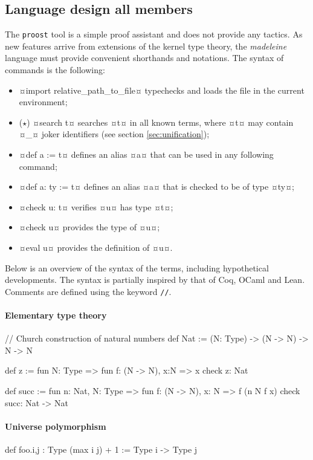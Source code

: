 \documentclass[twocolumn]{article}
\newcommand{\members}[1]{\texorpdfstring{\hfill\scriptsize #1}{}}
\newcommand{\etun}{{\color{Green} ($\star$)} }
\begin{document}
\subsection{Language design \members{all members}} The \texttt{proost} tool is a
simple proof assistant and does not provide any tactics. As new features arrive
from extensions of the kernel type theory, the \emph{madeleine} language must
provide convenient shorthands and notations. The syntax of commands is the
following:
\begin{itemize}
	\item ¤import relative_path_to_file¤ typechecks
	      and loads the file in the current environment;
	\item \etun ¤search t¤ searches ¤t¤ in all known terms, where ¤t¤ may contain
	      ¤_¤ joker identifiers (see section \ref{sec:unification});
	\item ¤def a := t¤
	      defines an alias ¤a¤ that can be used in any following command;
	\item ¤def a: ty := t¤ defines an alias ¤a¤ that is checked to
	      be of type ¤ty¤;
	\item ¤check u: t¤ verifies ¤u¤ has type ¤t¤;
	\item ¤check u¤ provides the type of ¤u¤;
	\item ¤eval u¤ provides the definition of ¤u¤.
\end{itemize}

Below is an overview of the syntax of the terms, including hypothetical
developments. The syntax is partially inspired by that of Coq, OCaml and Lean. Comments are
defined using the keyword \texttt{//}.

\paragraph{Elementary type theory}
\phantom{hello}
\begin{mdln}
// Church construction of natural numbers
def Nat :=
  (N: Type) -> (N -> N) -> N -> N

def z := fun N: Type =>
  fun f: (N -> N), x:N => x
check z: Nat

def succ := fun n: Nat, N: Type =>
  fun f: (N -> N), x: N =>
    f (n N f x)
check succ: Nat -> Nat
\end{mdln}

\paragraph{Universe polymorphism}
\phantom{hello}
\begin{mdln}
def foo.{i,j} : Type (max i j) + 1
  := Type i -> Type j
\end{mdln}
\end{document}
